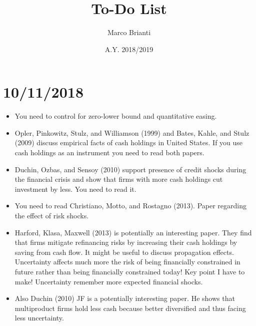 \documentclass{article}
\title{To-Do List}
\author{Marco Brianti}
\date{A.Y. 2018/2019}
\begin{document}
	\large{

\maketitle

\section*{10/11/2018}

\begin{itemize}
	\item You need to control for zero-lower bound and quantitative easing.
	\item Opler, Pinkowitz, Stulz, and Williamson (1999) and Bates, Kahle, and Stulz (2009) discuss empirical facts of cash holdings in United States. If you use cash holdings as an instrument you need to read both papers.
	\item Duchin, Ozbas, and Sensoy (2010) support presence of credit shocks during the financial crisis and show that firms with more cash holdings cut investment by less. You need to read it. 
	\item You need to read Christiano, Motto, and Rostagno (2013). Paper regarding the effect of risk shocks.
	\item Harford, Klasa, Maxwell (2013) is potentially an interesting paper. They find that firms mitigate refinancing risks by increasing their cash holdings by saving from cash flow. It might be useful to discuss propagation effects. Uncertainty affects much more the risk of being financially constrained in future rather than being financially constrained today! Key point I have to make! Uncertainty remember more expected financial shocks.
	\item Also Duchin (2010) JF is a potentially interesting paper. He shows that multiproduct firms hold less cash because better diversified and thus facing less uncertainty.
\end{itemize}


}
\end{document}
